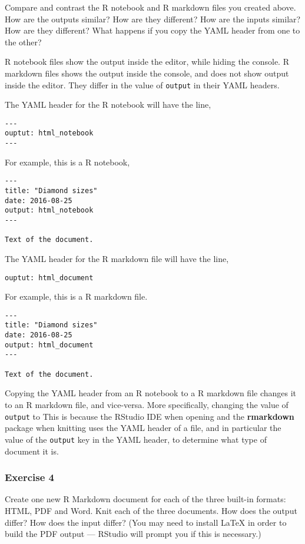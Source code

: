 \documentclass[]{book}
\theoremstyle{plain}
\theoremstyle{remark}
\theoremstyle{definition}
\theoremstyle{definition}
\theoremstyle{definition}
\theoremstyle{remark}
\begin{document}
Compare and contrast the R notebook and R markdown files you created
above. How are the outputs similar? How are they different? How are the
inputs similar? How are they different? What happens if you copy the
YAML header from one to the other?

R notebook files show the output inside the editor, while hiding the
console. R markdown files shows the output inside the console, and does
not show output inside the editor. They differ in the value of
\texttt{output} in their YAML headers.

The YAML header for the R notebook will have the line,

\begin{verbatim}
---
ouptut: html_notebook
---
\end{verbatim}

For example, this is a R notebook,

\begin{verbatim}
---
title: "Diamond sizes"
date: 2016-08-25
output: html_notebook
---

Text of the document.
\end{verbatim}

The YAML header for the R markdown file will have the line,

\begin{verbatim}
ouptut: html_document
\end{verbatim}

For example, this is a R markdown file.

\begin{verbatim}
---
title: "Diamond sizes"
date: 2016-08-25
output: html_document
---

Text of the document.
\end{verbatim}

Copying the YAML header from an R notebook to a R markdown file changes
it to an R markdown file, and vice-versa. More specifically, changing
the value of \texttt{output} to This is because the RStudio IDE when
opening and the \textbf{rmarkdown} package when knitting uses the YAML
header of a file, and in particular the value of the \texttt{output} key
in the YAML header, to determine what type of document it is.

\hypertarget{exercise-4-40}{%
\subsubsection{Exercise 4}\label{exercise-4-40}}

Create one new R Markdown document for each of the three built-in
formats: HTML, PDF and Word. Knit each of the three documents. How does
the output differ? How does the input differ? (You may need to install
LaTeX in order to build the PDF output --- RStudio will prompt you if
this is necessary.)
\end{document}
